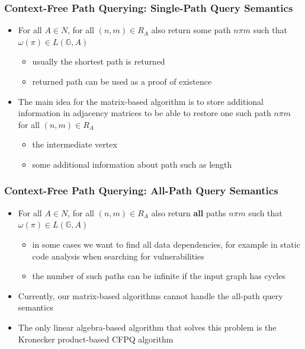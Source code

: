 \documentclass[xcolor=table,aspectratio=169]{beamer}
\begin{document}
\begin{frame}[fragile]
\frametitle{Context-Free Path Querying: Single-Path Query Semantics}
\begin{itemize}
	\item For all $A \in N$, for all $(n,m) \in R_A$ also return some path $n\pi m$ such that $\omega(\pi) \in L(\mathbb{G},A)$
	\begin{itemize}
		\item usually the shortest path is returned
		\item returned path can be used as a proof of existence
	\end{itemize}
	\pause
	\item The main idea for the matrix-based algorithm is to store additional information in adjacency matrices to be able to restore one such path $n \pi m$ for all $(n,m) \in R_A$
	\begin{itemize}
		\item the intermediate vertex
		\item some additional information about path such as length
	\end{itemize}
	
\end{itemize}
\end{frame}

\begin{frame}[fragile]
	\frametitle{Context-Free Path Querying: All-Path Query Semantics}
	\begin{itemize}
		\item For all $A \in N$, for all $(n,m) \in R_A$ also return \textbf{all} paths $n\pi m$ such that $\omega(\pi) \in L(\mathbb{G},A)$
		\begin{itemize}
			\item in some cases we want to find all data dependencies, for example in static code analysis when searching for vulnerabilities
			\item the number of such paths can be infinite if the input graph has cycles
		\end{itemize}
		\pause
		\item Currently, our matrix-based algorithms cannot handle the all-path query semantics
		
		\item The only linear algebra-based algorithm that solves this problem is the Kronecker product-based CFPQ algorithm
		
	\end{itemize}
\end{frame}
\end{document}
